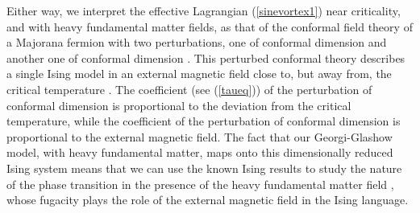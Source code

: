 \documentclass[a4paper,aps,prd,superscriptaddress,showpacs,showkeys]{revtex4}
\begin{document}
Either way, we interpret the effective Lagrangian (\ref{sinevortex1})
near criticality, and with heavy  fundamental matter fields, as that of
the \coordHE{} conformal field theory of a Majorana fermion
with two perturbations, one of conformal dimension
\coordHE{} and another one of conformal dimension \coordHE{}.
This perturbed conformal theory describes a single
Ising model
in an external magnetic field \coordHE{} close to, but away from, the critical
temperature
\cite{mccoy,delfino1,zamolodchikov}. 
The coefficient \myHighlight{$\tau$}\coordHE{} (see (\ref{taueq})) of the
perturbation of conformal dimension
\coordHE{} is proportional to the deviation from the
critical temperature, while the coefficient \coordHE{} of the perturbation of
conformal dimension \coordHE{} is proportional to the external
magnetic field. The fact that our Georgi-Glashow model, with heavy
fundamental matter, maps onto this dimensionally reduced Ising system
means that we can use the known Ising results to study the nature of the
phase transition in the presence of the heavy fundamental matter field
\myHighlight{$\Phi$}\coordHE{}, whose fugacity
\coordHE{} plays the role of the external magnetic field in the Ising language.
\end{document}
